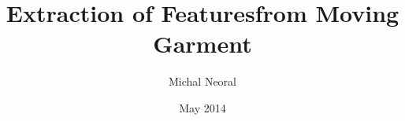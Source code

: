 



\def\thednum{(\the\chapnum.\the\dnum)}

\def\mind#1{\Red{\bf#1}\Black}
\def\dopln{\mind{DOPLŇ~ODKAZ!}}
\def\task#1{\Green{#1}\Black}
\def\lorem{\mind{Lorem ipsum dolor sit amet, consectetur adipiscing elit. Curabitur arcu dolor, congue sit amet pellentesque vitae, semper ac ligula. Nam eu elit erat. Phasellus pretium at tellus sed commodo. Quisque auctor metus eu diam pretium pulvinar. Curabitur posuere ligula sed dapibus aliquet. Sed aliquet malesuada felis, vel aliquam lacus laoreet non. Pellentesque in tristique erat. Ut mollis consequat interdum. Integer orci velit, venenatis sed ligula et, pretium dapibus sem. Nam rhoncus urna sed urna volutpat congue. Ut suscipit ipsum vel.}}
\def\newbeg{}
\def\newend{}


\worktype [B/EN]
\title      {Extraction of Features\nl from Moving Garment}
\author     {Michal Neoral}
\date       {May 2014}

\pagetwo    {}  %


